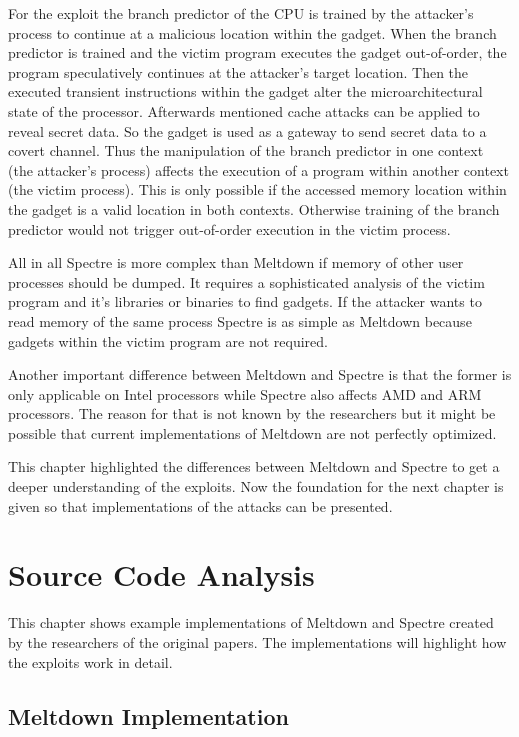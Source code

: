 \documentclass[a4paper,oneside,openright] {scrreprt}
\begin{document}
For the exploit the branch predictor of the CPU is trained by the attacker's process to continue at a malicious location 
within the gadget. When the branch predictor is trained and the victim program executes the gadget out-of-order, 
the program speculatively continues at the attacker's target location.
Then the executed transient instructions within the gadget alter the microarchitectural state of the processor.
Afterwards mentioned cache attacks can be applied to reveal secret data.
So the gadget is used as a gateway to send secret data to a covert channel.
Thus the manipulation of the branch predictor in one context (the attacker's process) affects the execution of a program
within another context (the victim process). 
This is only possible if the accessed memory location within the gadget is a valid location in both contexts.
Otherwise training of the branch predictor would not trigger out-of-order execution in the victim process.

All in all Spectre is more complex than Meltdown if memory of other user processes should be dumped.
It requires a sophisticated analysis of the victim program and it's libraries or binaries to find gadgets.
If the attacker wants to read memory of the same process Spectre is as simple as Meltdown because gadgets within the victim program
are not required.

Another important difference between Meltdown and Spectre is that the former is only applicable on Intel processors while Spectre 
also affects AMD and ARM processors. The reason for that is not known by the researchers but it might be possible that current 
implementations of Meltdown are not perfectly optimized.

This chapter highlighted the differences between Meltdown and Spectre to get a deeper understanding of the exploits.
Now the foundation for the next chapter is given so that implementations of the attacks can be presented.

\chapter{Source Code Analysis}
\label{ch:sourceCodeAnalysis}

This chapter shows example implementations of Meltdown and Spectre created by the researchers of the original papers.
The implementations will highlight how the exploits work in detail.

\section{Meltdown Implementation}
\label{ch:intro:motivation}
\end{document}
